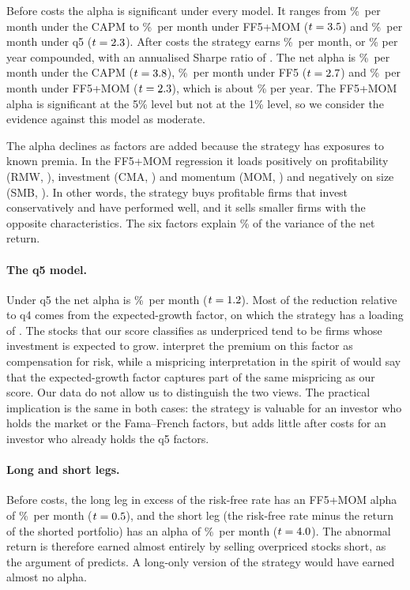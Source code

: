 \documentclass[12pt,a4paper]{article}
\newcommand{\pmo}{\%~per month}
\begin{document}
Before costs the alpha is significant under every model. It ranges from \grossfullcapm\pmo{} under the CAPM to \grossfulla\pmo{} under FF5+MOM ($t=3.5$) and \grossfullq\pmo{} under q5 ($t=2.3$). After costs the strategy earns \netfullmean\pmo, or \annret\% per year compounded, with an annualised Sharpe ratio of \netfullsr. The net alpha is \netfullcapm\pmo{} under the CAPM ($t=3.8$), \netfffivea\pmo{} under FF5 ($t=2.7$) and \netfulla\pmo{} under FF5+MOM ($t=2.3$), which is about \netfullann\% per year. The FF5+MOM alpha is significant at the 5\% level but not at the 1\% level, so we consider the evidence against this model as moderate.

The alpha declines as factors are added because the strategy has exposures to known premia. In the FF5+MOM regression it loads positively on profitability (RMW, \brmw), investment (CMA, \bcma) and momentum (MOM, \bmom) and negatively on size (SMB, \bsmb). In other words, the strategy buys profitable firms that invest conservatively and have performed well, and it sells smaller firms with the opposite characteristics. The six factors explain \arsq\% of the variance of the net return.

\paragraph{The q5 model.} Under q5 the net alpha is \netfullq\pmo{} ($t=1.2$). Most of the reduction relative to q4 comes from the expected-growth factor, on which the strategy has a loading of \egload. The stocks that our score classifies as underpriced tend to be firms whose investment is expected to grow. \citet{hou2021} interpret the premium on this factor as compensation for risk, while a mispricing interpretation in the spirit of \citet{stambaugh2017} would say that the expected-growth factor captures part of the same mispricing as our score. Our data do not allow us to distinguish the two views. The practical implication is the same in both cases: the strategy is valuable for an investor who holds the market or the Fama--French factors, but adds little after costs for an investor who already holds the q5 factors.

\paragraph{Long and short legs.} Before costs, the long leg in excess of the risk-free rate has an FF5+MOM alpha of \longa\pmo{} ($t=0.5$), and the short leg (the risk-free rate minus the return of the shorted portfolio) has an alpha of \shorta\pmo{} ($t=4.0$). The abnormal return is therefore earned almost entirely by selling overpriced stocks short, as the argument of \citet{stambaugh2017} predicts. A long-only version of the strategy would have earned almost no alpha.
\end{document}
